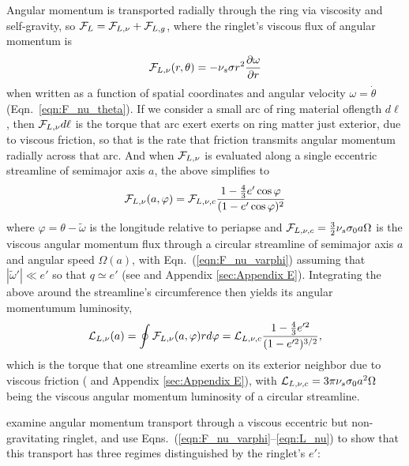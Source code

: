 \documentclass[preprint]{aastex62}
\begin{document}
Angular momentum is transported radially through the ring via viscosity and self-gravity, 
so ${\cal F}_L={\cal F}_{L,\nu} + {\cal F}_{L,g}$,
where the ringlet's viscous flux of angular momentum is
\begin{equation}
    \label{eqn:F_nu_theta}
    {\cal F}_{L,\nu}(r, \theta) = -\nu_s \sigma r^2\frac{\partial\omega}{\partial r}
\end{equation}
when written as a function of spatial coordinates and
angular velocity $\omega=\dot{\theta}$ (Eqn.\ \ref{eqn:F_nu_theta}). 
If we consider a small arc of 
ring material oflength $d\ell$, 
then ${\cal F}_{L,\nu}d\ell$ is the torque that arc exert exerts on
ring matter just exterior, due to viscous friction,
so that is the rate that friction transmits angular momentum radially across that arc.
And when ${\cal F}_{L,\nu}$ is evaluated along a single eccentric streamline of semimajor axis $a$, 
the above simplifies to
\begin{equation}
    \label{eqn:F_nu_varphi}
    {\cal F}_{L,\nu}(a, \varphi) = {\cal F}_{L,\nu,c}\frac{1-\frac{4}{3}e'\cos\varphi}{(1-e'\cos\varphi)^2}
\end{equation}
where $\varphi=\theta-\tilde{\omega}$ is the longitude relative to periapse
and ${\cal F}_{L,\nu,c}=\frac{3}{2}\nu_s\sigma_0a\Omega$ is the viscous angular momentum flux through a
circular streamline of semimajor axis $a$ and angular speed $\Omega(a)$,
with Eqn.\ (\ref{eqn:F_nu_varphi}) assuming  that
$|\tilde{\omega}'|\ll e'$ so that $q\simeq e'$
(see \citealt{BGT82} and Appendix \ref{sec:Appendix E}). Integrating the above
around the streamline's circumference then yields its angular momentumum luminosity,
\begin{equation}
    \label{eqn:L_nu}
    {\cal L}_{L,\nu}(a) = \oint {\cal F}_{L,\nu}(a, \varphi)rd\varphi = {\cal L}_{L,\nu,c}\frac{1-\frac{4}{3}e'^2}{(1-e'^2)^{3/2}},
\end{equation}
which is the torque that one streamline exerts on its exterior neighbor due to viscous friction
(\citealt{BGT82} and Appendix \ref{sec:Appendix E}),
with ${\cal L}_{L,\nu,c}=3\pi\nu_s\sigma_0a^2\Omega$
being the viscous angular momentum luminosity of a circular streamline.

\citet{BGT82} examine angular momentum transport through a viscous eccentric but non-gravitating ringlet, 
and use Eqns.\ (\ref{eqn:F_nu_varphi}--\ref{eqn:L_nu}) to show that this transport has three 
regimes distinguished by the ringlet's $e'$:
\end{document}
